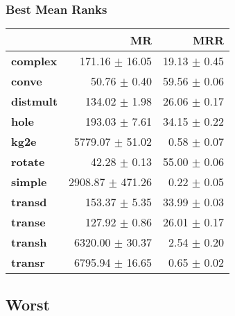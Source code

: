 \documentclass{article}
\begin{document}
    \subsubsection{Best Mean Ranks}
    \begin{center}
    \begin{tabular}{lrr}
\toprule
{} &                MR &           MRR \\
\midrule
\textbf{complex } &    171.16 $\pm$ 16.05 &  19.13 $\pm$ 0.45 \\
\textbf{conve   } &      50.76 $\pm$ 0.40 &  59.56 $\pm$ 0.06 \\
\textbf{distmult} &     134.02 $\pm$ 1.98 &  26.06 $\pm$ 0.17 \\
\textbf{hole    } &     193.03 $\pm$ 7.61 &  34.15 $\pm$ 0.22 \\
\textbf{kg2e    } &   5779.07 $\pm$ 51.02 &   0.58 $\pm$ 0.07 \\
\textbf{rotate  } &      42.28 $\pm$ 0.13 &  55.00 $\pm$ 0.06 \\
\textbf{simple  } &  2908.87 $\pm$ 471.26 &   0.22 $\pm$ 0.05 \\
\textbf{transd  } &     153.37 $\pm$ 5.35 &  33.99 $\pm$ 0.03 \\
\textbf{transe  } &     127.92 $\pm$ 0.86 &  26.01 $\pm$ 0.17 \\
\textbf{transh  } &   6320.00 $\pm$ 30.37 &   2.54 $\pm$ 0.20 \\
\textbf{transr  } &   6795.94 $\pm$ 16.65 &   0.65 $\pm$ 0.02 \\
\bottomrule
\end{tabular}

    \end{center}
    \subsection{Worst}
\end{document}
